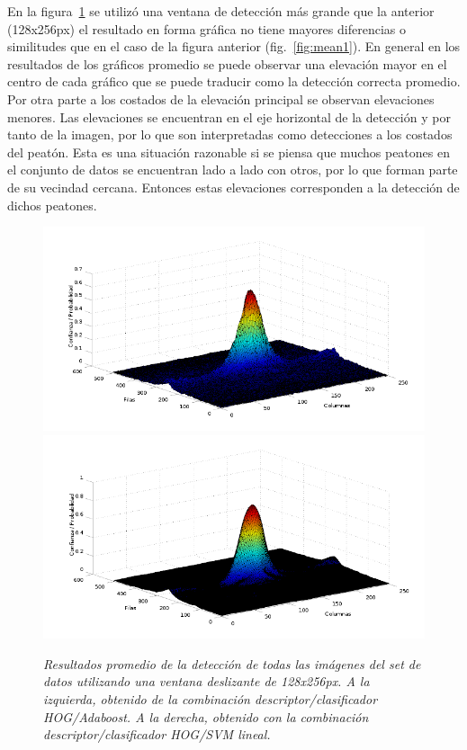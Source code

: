 En la figura~\ref{fig:mean2} se utilizó una ventana de detección más grande que la anterior (128x256px) el resultado en forma gráfica no tiene mayores diferencias o similitudes que en el caso de la figura anterior (fig.~\ref{fig:mean1}).
En general en los resultados de los gráficos promedio se puede observar una elevación mayor en el centro de cada gráfico que se puede traducir como la detección correcta promedio. Por otra parte a los costados de la elevación principal se observan elevaciones menores. Las elevaciones se encuentran en el eje horizontal de la detección y por tanto de la imagen, por lo que son interpretadas como detecciones a los costados del peatón. Esta es una situación razonable si se piensa que muchos peatones en el conjunto de datos se encuentran lado a lado con otros, por lo que forman parte de su vecindad cercana. Entonces estas elevaciones corresponden a la detección de dichos peatones. 

\begin{figure}[H]
  \centering
  \includegraphics[scale=.25]{images/mean/boost/128}
  \includegraphics[scale=.25]{images/mean/svm/128}
  \caption{\em  Resultados promedio de la detección de todas las imágenes del set de datos utilizando una ventana deslizante de 128x256px. A la izquierda, obtenido de la combinación descriptor/clasificador HOG/Adaboost. A la derecha, obtenido con la combinación descriptor/clasificador HOG/SVM lineal.}  
  \label{fig:mean2}
\end{figure}

